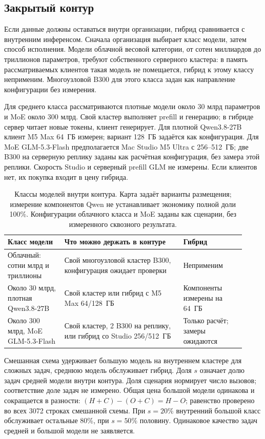 \subsection{Закрытый контур}
\label{sec:closed-contour}
Если данные должны оставаться внутри организации, гибрид сравнивается с внутренним инференсом.
Сначала организация выбирает класс модели, затем способ исполнения.
Модели облачной весовой категории, от сотен миллиардов до триллионов параметров, требуют собственного серверного кластера:
в память рассматриваемых клиентов такая модель не помещается, гибрид к этому классу неприменим.
Многоузловой B300 для этого класса задан как направление конфигурации без измерения.

Для среднего класса рассматриваются плотные модели около 30 млрд параметров и MoE около 300 млрд.
Свой кластер выполняет prefill и генерацию; в гибриде сервер читает новые токены, клиент генерирует.
Для плотной Qwen3.8-27B клиент M5 Max 64~ГБ измерен; вариант 128~ГБ задаётся как конфигурация.
Для MoE GLM-5.3-Flash предполагается Mac Studio M5 Ultra с 256--512~ГБ;
две B300 на серверную реплику заданы как расчётная конфигурация, без замера этой реплики.
Скорость Studio и серверный prefill GLM не измерены.
Если клиентов нет, их покупка входит в цену гибрида.

\begin{table}[t]
\centering
\caption{Классы моделей внутри контура. Карта задаёт варианты размещения;
измерение компонентов Qwen не устанавливает экономику полной доли 100\%.
Конфигурации облачного класса и MoE заданы как сценарии, без измеренного сквозного результата.}
\label{tab:closed-contour-map}
\footnotesize
\begin{tabular}{p{0.22\linewidth}p{0.46\linewidth}p{0.24\linewidth}}
\toprule
Класс модели & Что можно держать в контуре & Гибрид \\
\midrule
Облачный: сотни млрд и триллионы & Свой многоузловой кластер B300, конфигурация ожидает проверки & Неприменим \\
Около 30 млрд, плотная Qwen3.8-27B & Свой кластер или гибрид с M5 Max 64/128~ГБ & Компоненты измерены на 64~ГБ \\
Около 300 млрд, MoE GLM-5.3-Flash & Свой кластер, 2 B300 на реплику, или гибрид со Studio 256/512~ГБ & Только расчёт; замеры ожидаются \\
\bottomrule
\end{tabular}
\end{table}

Смешанная схема удерживает большую модель на внутреннем кластере для сложных задач,
среднюю модель обслуживает гибрид. Доля $s$ означает долю задач средней модели внутри контура.
Доля сценария нормирует число вызовов; соответствие доле задач не измерено.
Общая цена большой модели одинакова и сокращается в разности: $(H+C)-(O+C)=H-O$;
равенство проверено во всех 3072 строках смешанной схемы.
При $s=20\%$ внутренний большой класс обслуживает остальные 80\%, при $s=50\%$ половину.
Одинаковое качество задач средней и большой модели не заявляется.


